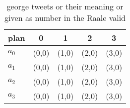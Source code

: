 \documentclass[a4paper]{article}
\begin{document}
\begin{table}
\begin{adjustbox}{width=1\columnwidth}
\begin{tabular}{|l|l|l|l|l|}
\hline
\textbf{plan} & \multicolumn{1}{c|}{\textbf{0}} & \multicolumn{1}{c|}{\textbf{1}} & \multicolumn{1}{c|}{\textbf{2}} & \multicolumn{1}{c|}{\textbf{3}} \\ \hline
\textbf{$a_0$}  & (0,0) & (1,0) & (2,0) & (3,0) \\ \hline
\textbf{$a_1$}  & (0,0) & (1,0) & (2,0) & (3,0) \\ \hline
\textbf{$a_2$}  & (0,0) & (1,0) & (2,0) & (3,0) \\ \hline
\textbf{$a_3$}  & (0,0) & (1,0) & (2,0) & (3,0) \\ \hline
\end{tabular}
\end{adjustbox}
\caption{ george tweets or their meaning or given as number in the Raale valid
}
\end{table}
\end{document}
